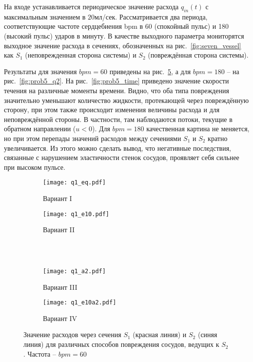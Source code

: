 На входе устанавливается периодическое значение расхода $q_{in}(t)$
с максимальным значением в $20$мл/сек.
Рассматривается два периода, соответствующие частоте сердцебиения \gls{bpm} в 60 (спокойный пульс) и 180 (высокий пульс) ударов в минуту.
В качестве выходного параметра мониторятся выходное значение расхода в сечениях, обозначенных на рис.~\ref{fig:seven_vessel} как $S_1$ (неповрежденная сторона системы)
и $S_2$ (повреждённая сторона системы).

Результаты для значения $bpm=60$ приведены на рис.~\ref{fig:prob5_q1}, а для $bpm=180$ -- на рис.~\ref{fig:prob5_q2}.
На рис.~\ref{fig:prob5_time} приведено значение скорости течения на различные моменты времени.
Видно, что оба типа повреждения значительно уменьшают количество
жидкости, протекающей через повреждённую сторону, при этом также происходит
изменения величины расхода и для неповреждённой стороны. В частности, там наблюдаются потоки, текущие в обратном направлении ($u<0$).
Для $bpm=180$ качественная картина не меняется, но при этом перепады значений расходов между сечениями $S_1$ и $S_2$
кратно увеличивается.
Из этого можно сделать вывод, что негативные последствия, связанные с нарушением эластичности стенок сосудов, проявляет себя сильнее при
высоком пульсе.

\begin{figure}[h!]
\begin{subfigure}{0.5\linewidth}\centering
\texttt{[image: q1\_eq.pdf]}
\caption{Вариант I}\label{fig:prob5_q1_eq}
\end{subfigure}%
\begin{subfigure}{0.5\linewidth}\centering
\texttt{[image: q1\_e10.pdf]}
\caption{Вариант II}\label{fig:prob5_q1_e10}
\end{subfigure} \\
\hfill \\
\begin{subfigure}{0.5\linewidth}\centering
\texttt{[image: q1\_a2.pdf]}
\caption{Вариант III}\label{fig:prob5_q1_a2}
\end{subfigure}%
\begin{subfigure}{0.5\linewidth}\centering
\texttt{[image: q1\_e10a2.pdf]}
\caption{Вариант IV}\label{fig:prob5_a1_e10a2}
\end{subfigure}%
\caption{Значение расходов через сечения $S_1$ (красная линия) и $S_2$ (синяя линия) для различных способов повреждения сосудов, ведущих к $S_2$. Частота -- $bpm=60$}
\label{fig:prob5_q1}
\end{figure}

